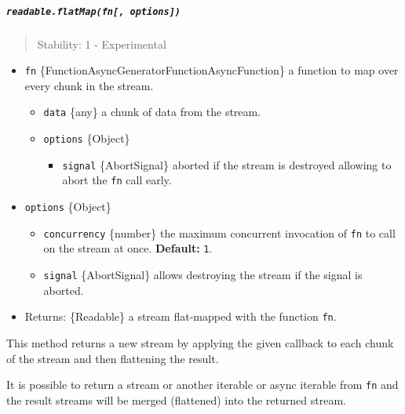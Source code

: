 \subparagraph{\texorpdfstring{\texttt{readable.flatMap(fn{[},\ options{]})}}{readable.flatMap(fn{[}, options{]})}}\label{readable.flatmapfn-options}

\begin{quote}
Stability: 1 - Experimental
\end{quote}

\begin{itemize}
\tightlist
\item
  \texttt{fn}
  \{Function\textbar AsyncGeneratorFunction\textbar AsyncFunction\} a
  function to map over every chunk in the stream.

  \begin{itemize}
  \tightlist
  \item
    \texttt{data} \{any\} a chunk of data from the stream.
  \item
    \texttt{options} \{Object\}

    \begin{itemize}
    \tightlist
    \item
      \texttt{signal} \{AbortSignal\} aborted if the stream is destroyed
      allowing to abort the \texttt{fn} call early.
    \end{itemize}
  \end{itemize}
\item
  \texttt{options} \{Object\}

  \begin{itemize}
  \tightlist
  \item
    \texttt{concurrency} \{number\} the maximum concurrent invocation of
    \texttt{fn} to call on the stream at once. \textbf{Default:}
    \texttt{1}.
  \item
    \texttt{signal} \{AbortSignal\} allows destroying the stream if the
    signal is aborted.
  \end{itemize}
\item
  Returns: \{Readable\} a stream flat-mapped with the function
  \texttt{fn}.
\end{itemize}

This method returns a new stream by applying the given callback to each
chunk of the stream and then flattening the result.

It is possible to return a stream or another iterable or async iterable
from \texttt{fn} and the result streams will be merged (flattened) into
the returned stream.

